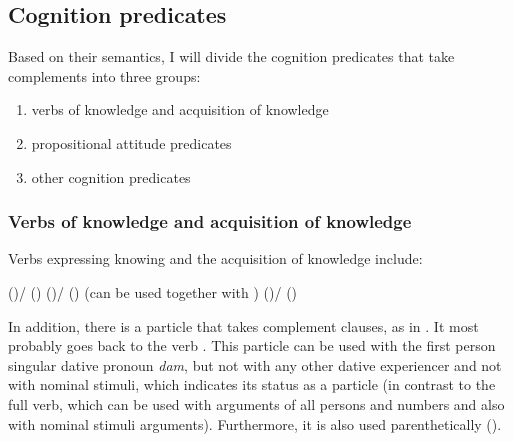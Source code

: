 
\subsection{Cognition predicates}
\label{ssec:Cognition predicates}

Based on their semantics, I will divide the cognition predicates that take complements into three groups:
%
\begin{enumerate}
	\item	verbs of knowledge and acquisition of knowledge
	\item	propositional attitude predicates
	\item	other cognition predicates
\end{enumerate}



\subsubsection{Verbs of knowledge and acquisition of knowledge}
\label{sssec:Verbs of knowledge and acquisition of knowledge}

Verbs expressing knowing and the acquisition of knowledge include:
%
\begin{exe}
	\ex	\label{ex:verbs of knowledge}
	\begin{xlist}
		\ex	{} ()\slash{} () 
		\ex	{} ()\slash{} ()  (can be used together with  )
		\ex	{} ()\slash{} ()  
	\end{xlist}
\end{exe}

In addition, there is a particle   that takes complement clauses, as in . It most probably goes back to the verb . This particle can be used with the first person singular dative pronoun \textit{dam}, but not with any other dative experiencer and not with nominal stimuli, which indicates its status as a particle (in contrast to the full verb, which can be used with arguments of all persons and numbers and also with nominal stimuli arguments). Furthermore, it is also used parenthetically ().


